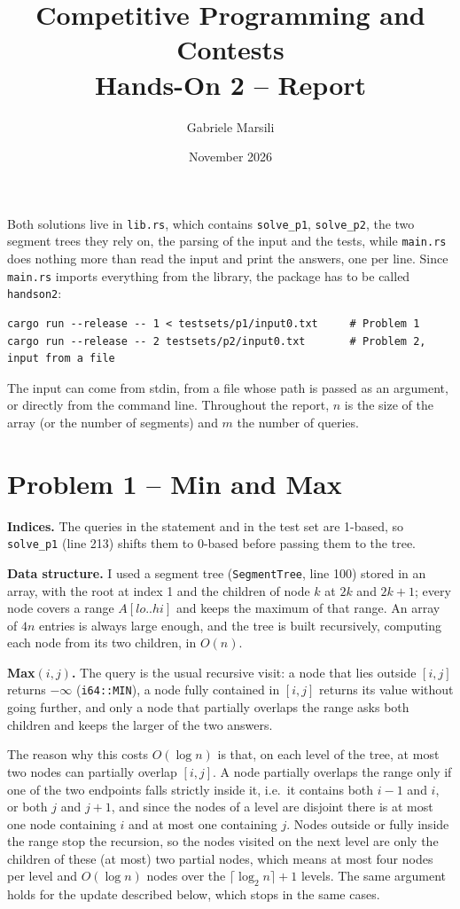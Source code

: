 \documentclass[11pt,a4paper]{article}
\title{Competitive Programming and Contests\\Hands-On 2 -- Report}
\author{Gabriele Marsili}
\date{November 2026}
\begin{document}
\sloppy
\maketitle

Both solutions live in \texttt{lib.rs}, which contains \texttt{solve\_p1}, \texttt{solve\_p2}, the two segment
trees they rely on, the parsing of the input and the tests, while \texttt{main.rs} does nothing more than read
the input and print the answers, one per line. Since \texttt{main.rs} imports everything from the library, the
package has to be called \texttt{handson2}:
\begin{lstlisting}
cargo run --release -- 1 < testsets/p1/input0.txt     # Problem 1
cargo run --release -- 2 testsets/p2/input0.txt       # Problem 2, input from a file
\end{lstlisting}
The input can come from stdin, from a file whose path is passed as an argument, or directly from the command
line. Throughout the report, $n$ is the size of the array (or the number of segments) and $m$ the number of
queries.

\section*{Problem 1 -- Min and Max}

\textbf{Indices.} The queries in the statement and in the test set are 1-based, so \texttt{solve\_p1}
(line 213) shifts them to 0-based before passing them to the tree.

\textbf{Data structure.} I used a segment tree (\texttt{SegmentTree}, line 100) stored in an array, with the
root at index 1 and the children of node $k$ at $2k$ and $2k+1$; every node covers a range $A[lo..hi]$ and
keeps the maximum of that range. An array of $4n$ entries is always large enough, and the tree is built
recursively, computing each node from its two children, in $O(n)$.

\textbf{Max$(i,j)$.} The query is the usual recursive visit: a node that lies outside $[i,j]$ returns
$-\infty$ (\texttt{i64::MIN}), a node fully contained in $[i,j]$ returns its value without going further, and
only a node that partially overlaps the range asks both children and keeps the larger of the two answers.

The reason why this costs $O(\log n)$ is that, on each level of the tree, at most two nodes can partially
overlap $[i,j]$. A node partially overlaps the range only if one of the two endpoints falls strictly inside
it, i.e.\ it contains both $i-1$ and $i$, or both $j$ and $j+1$, and since the nodes of a level are disjoint
there is at most one node containing $i$ and at most one containing $j$. Nodes outside or fully inside the
range stop the recursion, so the nodes visited on the next level are only the children of these (at most)
two partial nodes, which means at most four nodes per level and $O(\log n)$ nodes over the $\lceil\log_2
n\rceil + 1$ levels. The same argument holds for the update described below, which stops in the same cases.
\end{document}
